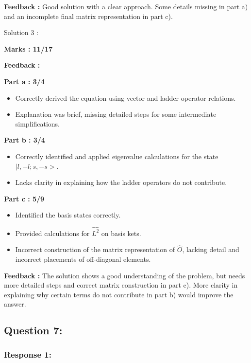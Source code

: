 \documentclass[a4paper,11pt]{article}
\begin{document}
\textbf{Feedback :}
Good solution with a clear approach. Some details missing in part a) and an incomplete final matrix representation in part c).



Solution 3 :

\textbf{Marks : 11/17}

\textbf{Feedback : }

\textbf{Part a : 3/4}

\begin{itemize}
    \item Correctly derived the equation using vector and ladder operator relations.
    \item Explanation was brief, missing detailed steps for some intermediate simplifications.
\end{itemize}


\textbf{Part b : 3/4}

\begin{itemize}
    \item Correctly identified and applied eigenvalue calculations for the state $|l, -l;s, -s>$.
    \item Lacks clarity in explaining how the ladder operators do not contribute.
\end{itemize}


\textbf{Part c : 5/9}

\begin{itemize}
    \item Identified the basis states correctly.
    \item Provided calculations for $\hat{L^2}$ on basis kets.
    \item Incorrect construction of the matrix representation of $\hat{O}$, lacking detail and incorrect placements of off-diagonal elements.
\end{itemize}

\textbf{Feedback :}
The solution shows a good understanding of the problem, but needs more detailed steps and correct matrix construction in part c). More clarity in explaining why certain terms do not contribute in part b) would improve the answer.



\subsection*{Question 7:}

\subsubsection*{Response 1:}
\end{document}
